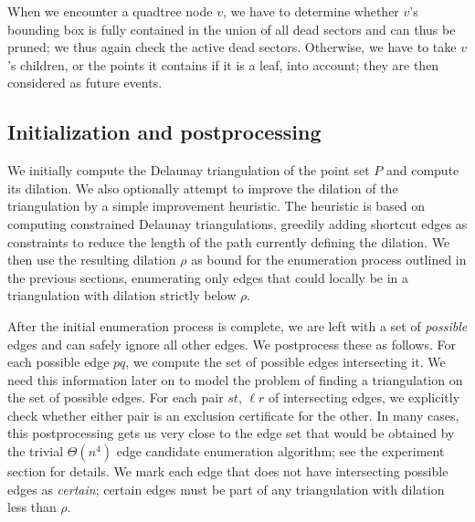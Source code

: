 When we encounter a quadtree node $v$, we have to determine whether $v$'s bounding box is fully contained 
in the union of all dead sectors and can thus be pruned; we thus again check the active dead sectors.
Otherwise, we have to take $v$'s children, or the points it contains if it is a leaf, into account;
they are then considered as future events.

\subsection{Initialization and postprocessing}
We initially compute the Delaunay triangulation of the point set $P$ and compute its dilation.
We also optionally attempt to improve the dilation of the triangulation by a simple improvement heuristic.
The heuristic is based on computing constrained Delaunay triangulations,
greedily adding shortcut edges as constraints to reduce the length of the path currently defining the dilation.
We then use the resulting dilation $\rho$ as bound for the enumeration process outlined in the previous sections,
enumerating only edges that could locally be in a triangulation with dilation strictly below $\rho$.

After the initial enumeration process is complete, we are left with a set of \emph{possible} edges and can safely ignore all other edges.
We postprocess these as follows.
For each possible edge $pq$, we compute the set of possible edges intersecting it.
We need this information later on to model the problem of finding a triangulation on the set of possible edges.
For each pair $st$, $\ell r$ of intersecting edges, we explicitly check whether either pair is an exclusion certificate for the other.
In many cases, this postprocessing gets us very close to the edge set that would be obtained by the trivial $\Theta(n^4)$ edge candidate enumeration algorithm;
see the experiment section for details.
We mark each edge that does not have intersecting possible edges as \emph{certain};
certain edges must be part of any triangulation with dilation less than $\rho$.

